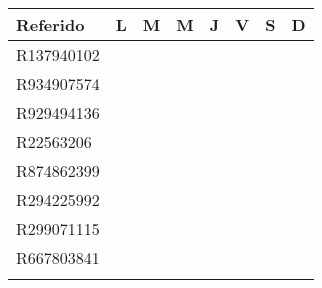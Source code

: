 \documentclass[a4paper,12pt]{article}
\begin{document}
\begin{tabular}{| l | l | l | l | l | l | l | l |}
\hline
Referido & L & M & M & J & V & S & D \\ \hline
R137940102 & & & & & & & \\ \hline
R934907574 & & & & & & & \\ \hline
R929494136 & & & & & & & \\ \hline
R22563206 & & & & & & & \\ \hline
R874862399 & & & & & & & \\ \hline
R294225992 & & & & & & & \\ \hline
R299071115 & & & & & & & \\ \hline
R667803841 & & & & & & & \\ \hline
 & & & & & & & \\ \hline
\end{tabular}
\end{document}
